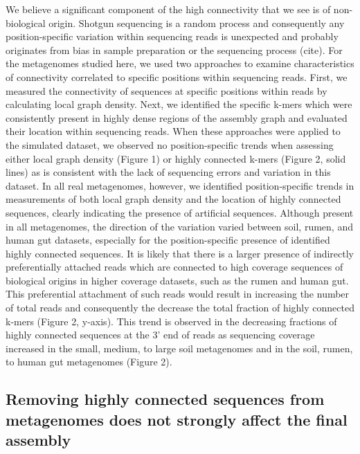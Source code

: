 \documentclass[10pt]{article}
\begin{document}

We believe a significant component of the high connectivity that we
see is of non-biological origin.  Shotgun sequencing is a random
process and consequently any position-specific variation within
sequencing reads is unexpected and probably originates from bias in
sample preparation or the sequencing process (cite).  For the
metagenomes studied here, we used two approaches to examine
characteristics of connectivity correlated to specific positions
within sequencing reads.  First, we measured the connectivity of
sequences at specific positions within reads by calculating local
graph density.  Next, we identified the specific k-mers which were
consistently present in highly dense regions of the assembly graph and
evaluated their location within sequencing reads.  When these
approaches were applied to the simulated dataset, we observed no
position-specific trends when assessing either local graph density
(Figure 1) or highly connected k-mers (Figure 2, solid lines) as is
consistent with the lack of sequencing errors and variation in this
dataset.  In all real metagenomes, however, we identified
position-specific trends in measurements of both local graph density
and the location of highly connected sequences, clearly indicating the
presence of artificial sequences.  Although present in all
metagenomes, the direction of the variation varied between soil,
rumen, and human gut datasets, especially for the position-specific
presence of identified highly connected sequences.  It is likely that
there is a larger presence of indirectly preferentially attached reads
which are connected to high coverage sequences of biological origins
in higher coverage datasets, such as the rumen and human gut.  This
preferential attachment of such reads would result in increasing the
number of total reads and consequently the decrease the total fraction
of highly connected k-mers (Figure 2, y-axis).  This trend is observed
in the decreasing fractions of highly connected sequences at the 3'
end of reads as sequencing coverage increased in the small, medium, to
large soil metagenomes and in the soil, rumen, to human gut
metagenomes (Figure 2).

\subsection*{Removing highly connected sequences from metagenomes does not
strongly affect the final assembly}
\end{document}
